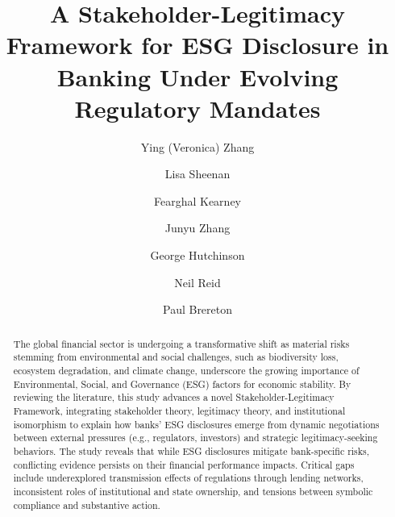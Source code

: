 \documentclass[
  authoryear]{elsarticle}
\begin{document}
\begin{frontmatter}
\title{A Stakeholder-Legitimacy Framework for ESG Disclosure in Banking
Under Evolving Regulatory Mandates}

\author[1]{Ying (Veronica) Zhang%
%
}
\author[1,2]{Lisa Sheenan%
%
}

\author[3]{Fearghal Kearney%
%
}

\author[1]{Junyu Zhang%
%
}

\author[1]{George Hutchinson%
%
}

\author[1,4]{Neil Reid%
%
}

\author[1]{Paul Brereton%
%
}








        
\begin{abstract}
The global financial sector is undergoing a transformative shift as
\hspace{0pt}material risks stemming from environmental and social
challenges, such as\hspace{0pt} biodiversity loss, ecosystem
degradation, \hspace{0pt}and climate change,\hspace{0pt}\hspace{0pt}
underscore the growing importance of Environmental, Social, and
Governance (ESG) factors for economic stability. By reviewing the
literature, this study advances a novel Stakeholder-Legitimacy
Framework, integrating stakeholder theory, legitimacy theory, and
institutional isomorphism to explain how banks' ESG disclosures emerge
from dynamic negotiations between external pressures (e.g., regulators,
investors) and strategic legitimacy-seeking behaviors. The study reveals
that while ESG disclosures mitigate bank-specific risks, conflicting
evidence persists on their financial performance impacts. Critical gaps
include underexplored transmission effects of regulations through
lending networks, inconsistent roles of institutional and state
ownership, and tensions between symbolic compliance and substantive
action.
\end{abstract}






\end{frontmatter}
\end{document}
